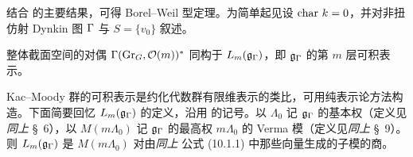 结合 \cite{Ku,Ma} 的主要结果，可得 Borel--Weil 型定理。为简单起见设 ${\operatorname{char}}\ k=0$，并对非扭仿射 Dynkin 图 ${\Gamma}$ 与 $S=\{v_0\}$ 叙述。

\begin{thm}\label{Borel-Weil}
整体截面空间的对偶 ${\Gamma}({\operatorname{Gr}}_G,{\mathcal O}(m))^*$ 同构于 $L_m({\mathfrak g}_{\Gamma})$，即 ${\mathfrak g}_{{\Gamma}}$ 的第 $m$ 层可积表示。
\end{thm}

Kac--Moody 群的可积表示是约化代数群有限维表示的类比，可用纯表示论方法构造。下面简要回忆 $L_m({\mathfrak g}_{\Gamma})$ 的定义，沿用 \cite{Kac} 的记号。以 $\Lambda_0$ 记 ${\mathfrak g}_{\Gamma}$ 的基本权（定义见\emph{同上} \S\ 6），以 $M(m\Lambda_0)$ 记 ${\mathfrak g}_{\Gamma}$ 的最高权 $m\Lambda_0$ 的 Verma 模（定义见\emph{同上} \S\ 9）。则 $L_m({\mathfrak g}_{\Gamma})$ 是 $M(m\Lambda_0)$ 对由\emph{同上} 公式 (10.1.1) 中那些向量生成的子模的商。
